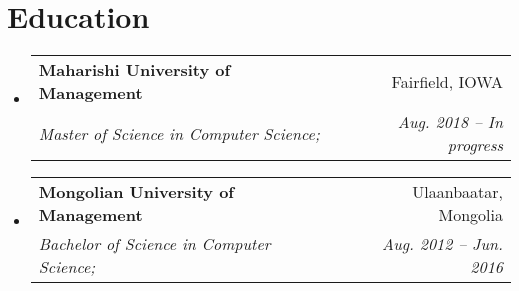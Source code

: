 \documentclass[letterpaper,11pt]{article}
\makeatletter
\newcommand{\resumeSubheading}[4]{
  \vspace{-1pt}\item
    \begin{tabular*}{0.97\textwidth}[t]{l@{\extracolsep{\fill}}r}
      \textbf{#1} & #2 \\
      \textit{\small#3} & \textit{\small #4} \\
    \end{tabular*}\vspace{-5pt}
}
\newcommand{\resumeSubHeadingListStart}{\begin{itemize}[leftmargin=*]}
\newcommand{\resumeSubHeadingListEnd}{\end{itemize}}
\makeatother
\begin{document}
\section{Education}
  \resumeSubHeadingListStart
    \resumeSubheading
      {Maharishi University of Management}{Fairfield, IOWA}
      {Master of Science in Computer Science;}{Aug. 2018 -- In progress}
    \resumeSubheading
      {Mongolian University of Management}{Ulaanbaatar, Mongolia}
      {Bachelor of Science in Computer Science;}{Aug. 2012 -- Jun. 2016}
  \resumeSubHeadingListEnd

\end{document}
